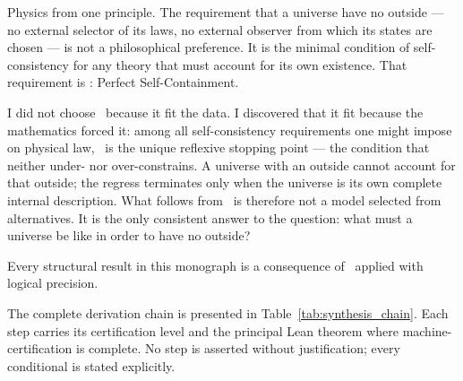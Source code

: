 \documentclass[11pt,openany]{book}
\theoremstyle{remark}
\newcommand{\PSC}{\text{PSC}}
\begin{document}
Physics from one principle. The requirement that a universe have no outside --- no
external selector of its laws, no external observer from which its states are
chosen --- is not a philosophical preference. It is the minimal condition of
self-consistency for any theory that must account for its own existence. That
requirement is \PSC: Perfect Self-Containment.

I did not choose \PSC\ because it fit the data. I discovered that it fit because
the mathematics forced it: among all self-consistency requirements one might impose
on physical law, \PSC\ is the unique reflexive stopping point --- the condition that
neither under- nor over-constrains. A universe with an outside cannot account for
that outside; the regress terminates only when the universe is its own complete
internal description. What follows from \PSC\ is therefore not a model selected
from alternatives. It is the only consistent answer to the question: what must a
universe be like in order to have no outside?

Every structural result in this monograph is a consequence of \PSC\ applied with logical precision.

The complete derivation chain is presented in Table~\ref{tab:synthesis_chain}. Each
step carries its certification level and the principal Lean theorem where
machine-certification is complete. No step is asserted without justification; every
conditional is stated explicitly.
\end{document}
